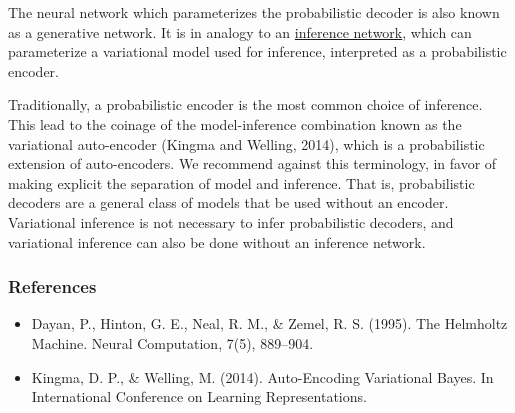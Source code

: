 The neural network which parameterizes the probabilistic decoder is
also known as a generative network. It is in analogy to an
\href{tut_inference_networks}{inference network}, which
can parameterize a variational model used for inference,
interpreted as a probabilistic encoder.

Traditionally, a probabilistic encoder is the most common
choice of inference. This lead to the coinage of the model-inference
combination known as the variational auto-encoder
(Kingma and Welling, 2014), which is a probabilistic extension of
auto-encoders.
We recommend against this terminology,
in favor of making explicit the separation of model and inference.
That is, probabilistic decoders are a general class of
models that be used without an encoder.
Variational
inference is not necessary to infer probabilistic decoders, and
variational inference can also be done without an inference network.

\subsubsection{References}\label{references}

\begin{itemize}
\item
  Dayan, P., Hinton, G. E., Neal, R. M., & Zemel, R. S. (1995). The Helmholtz Machine. Neural Computation, 7(5), 889–904.
\item
  Kingma, D. P., & Welling, M. (2014). Auto-Encoding Variational Bayes. In International Conference on Learning Representations.
\end{itemize}
